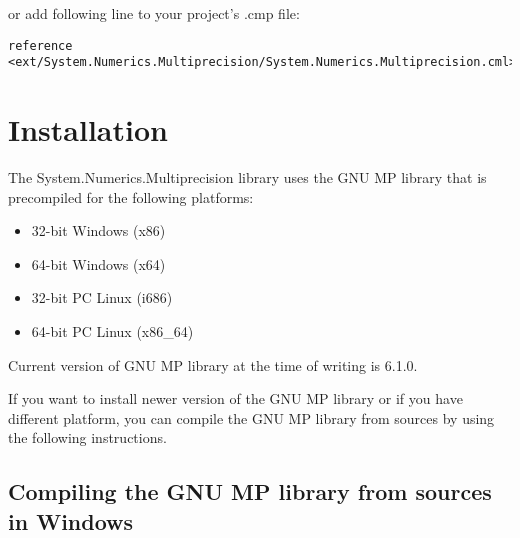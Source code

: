 \documentclass[a4paper,oneside,11.000000pt]{book}
\begin{document}
\begin{flushleft}
or add following line to your project's .cmp file:
\begin{verbatim}
reference <ext/System.Numerics.Multiprecision/System.Numerics.Multiprecision.cml>;
\end{verbatim}
\end{flushleft}

\chapter{Installation}

The System.Numerics.Multiprecision library uses the GNU MP library
that is precompiled for the following platforms:

\begin{itemize}
\item 32-bit Windows (x86)
\item 64-bit Windows (x64)
\item 32-bit PC Linux (i686)
\item 64-bit PC Linux (x86\_64)
\end{itemize}

Current version of GNU MP library at the time of writing is 6.1.0.

If you want to install newer version of the GNU MP library or
if you have different platform, you can compile the GNU MP library from sources
by using the following instructions.

\section{Compiling the GNU MP library from sources in Windows}
\end{document}
